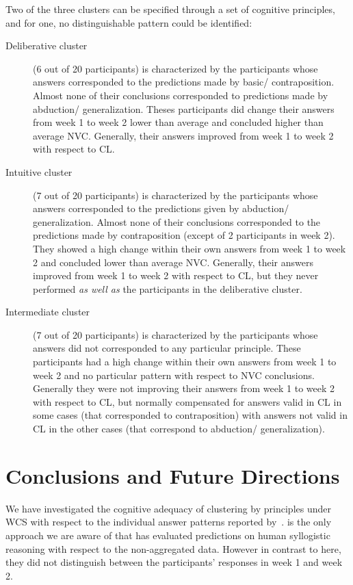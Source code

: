 \documentclass[12pt]{article}
\begin{document}
Two of the three clusters can be specified through a set of cognitive principles, and for one, no distinguishable pattern could be identified:
\begin{description}
 \item[Deliberative cluster] (6 out of 20 participants) is characterized by the participants whose answers corresponded to the predictions made by basic/ contraposition. Almost none of their conclusions corresponded to predictions made by abduction/ generalization. Theses participants did change their answers from week 1 to week 2 
 lower than average and concluded higher than average NVC. Generally, their answers improved from week 1 to week 2 with respect to CL.
 \item[Intuitive cluster] (7 out of 20 participants)
is characterized by the participants whose answers corresponded to the predictions given by abduction/ generalization. Almost none of their conclusions corresponded to the predictions made by contraposition (except of 2 participants in week 2). They showed a high change within their own answers from week 1 to week 2 
 and concluded lower than average NVC. Generally, their answers improved from week 1 to week 2 with respect to CL, but they never performed \textit{as well as} the participants in 
 the deliberative cluster.
 \item[Intermediate cluster] (7 out of 20 participants) is characterized by the participants whose answers did not corresponded to any particular principle. These participants had a high change within their own answers from week 1 to week 2
 and no particular pattern with respect to NVC conclusions. Generally they were not improving their answers from week 1 to week 2 with respect to CL, but normally compensated for answers valid in CL in some cases (that corresponded to contraposition) with answers not valid in CL in the other cases (that correspond to abduction/ generalization).
\end{description}

 \section{Conclusions and Future Directions}
 
 
We have investigated the cognitive adequacy of clustering by principles under WCS with respect to the individual answer patterns reported by~\cite{khemlani:2016}.
\cite{khemlani:2016} is the only approach we are aware of that has evaluated predictions on human syllogistic reasoning
with respect to the non-aggregated data.
However in contrast to here, they did not distinguish between the participants' responses in week 1 and week 2.
 
\end{document}
